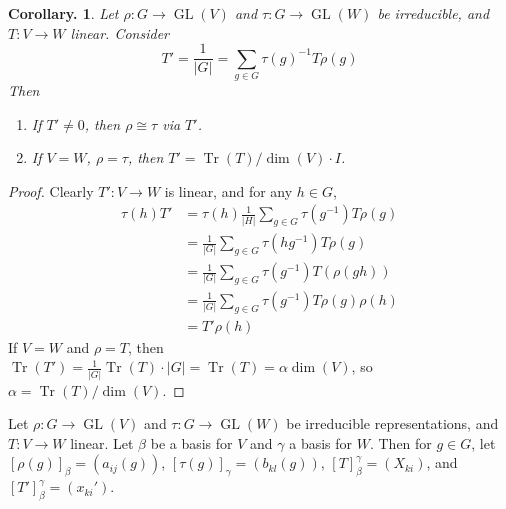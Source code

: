 \documentclass[11pt, a4paper]{memoir}
\theoremstyle{change}
\newtheorem{corollary}[theorem]{Corollary.}
\theoremstyle{plain}
\theoremstyle{nonumberplain}
\newtheorem{proof}{Proof}
\DeclareMathOperator{\GL}{GL}
\DeclareMathOperator{\Tr}{Tr}
\numberwithin{equation}{section}
\begin{document}
\begin{corollary}
    Let $\rho:G\to\GL(V)$ and $\tau:G\to\GL(W)$ be irreducible, and $T:V\to W$ linear.
    Consider
    \begin{equation*}
        T'=\frac{1}{|G|}=\sum_{g\in G}\tau(g)^{-1} T\rho(g)
    \end{equation*}
    Then
    \begin{enumerate}[nl,r]
        \item If $T'\neq 0$, then $\rho\cong\tau$ via $T'$.
        \item If $V=W$, $\rho=\tau$, then $T'=\Tr(T)/\dim(V)\cdot I$.
    \end{enumerate}
\end{corollary}
\begin{proof}
    Clearly $T':V\to W$ is linear, and for any $h\in G$,
    \begin{align*}
        \tau(h)T'&=\tau(h)\frac{1}{|H|}\sum_{g\in G}\tau(g^{-1})T\rho(g)\\
                 &= \frac{1}{|G|}\sum_{g\in G}\tau(hg^{-1})T\rho(g)\\
                 &=\frac{1}{|G|}\sum_{g\in G}\tau(g^{-1})T(\rho(gh))\\
                 &= \frac{1}{|G|}\sum_{g\in G}\tau(g^{-1})T\rho(g)\rho(h)\\
                 &= T'\rho(h)
    \end{align*}
    If $V=W$ and $\rho=T$, then $\Tr(T')=\frac{1}{|G|}\Tr(T)\cdot|G|=\Tr(T)=\alpha\dim(V)$, so $\alpha=\Tr(T)/\dim(V)$.
\end{proof}
Let $\rho:G\to\GL(V)$ and $\tau:G\to\GL(W)$ be irreducible representations, and $T:V\to W$ linear.
Let $\beta$ be a basis for $V$ and $\gamma$ a basis for $W$.
Then for $g\in G$, let $[\rho(g)]_\beta=(a_{ij}(g))$, $[\tau(g)]_{\gamma}=(b_{kl}(g))$, $[T]_\beta^\gamma=(X_{ki})$, and $[T']_{\beta}^\gamma=(x_{ki}')$.
\end{document}
